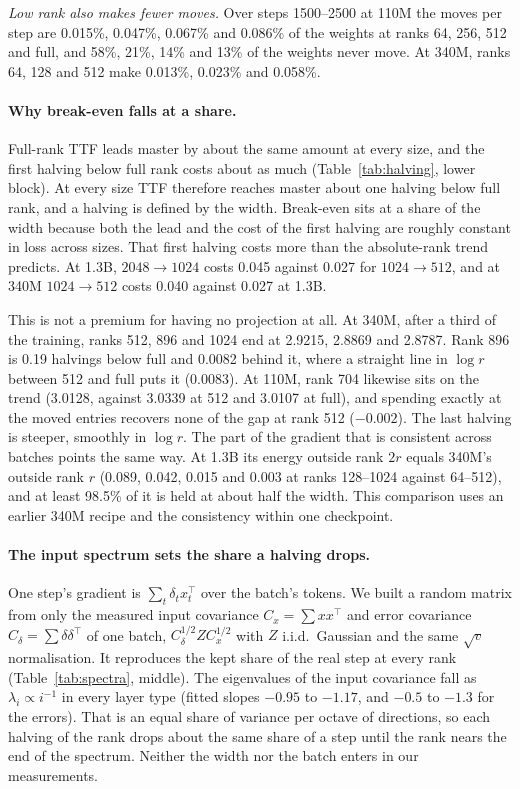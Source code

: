\documentclass[10pt,twocolumn]{article}
\begin{document}
\emph{Low rank also makes fewer moves.} Over steps 1500--2500 at 110M the moves per step are 0.015\%, 0.047\%, 0.067\%
and 0.086\% of the weights at ranks 64, 256, 512 and full, and 58\%, 21\%, 14\% and 13\% of the weights never move. At
340M, ranks 64, 128 and 512 make 0.013\%, 0.023\% and 0.058\%.

\paragraph{Why break-even falls at a share.} Full-rank TTF leads master by about the same amount at every size, and the
first halving below full rank costs about as much (Table~\ref{tab:halving}, lower block). At every size TTF therefore
reaches master about one halving below full rank, and a halving is defined by the width. Break-even sits at a share of
the width because both the lead and the cost of the first halving are roughly constant in loss across sizes. That first
halving costs more than the absolute-rank trend predicts. At 1.3B, $2048\to1024$ costs 0.045 against 0.027 for
$1024\to512$, and at 340M $1024\to512$ costs 0.040 against 0.027 at 1.3B.

This is not a premium for having no projection at all. At 340M, after a third of the training, ranks 512, 896 and 1024
end at 2.9215, 2.8869 and 2.8787. Rank 896 is 0.19 halvings below full and 0.0082 behind it, where a straight line in
$\log r$ between 512 and full puts it (0.0083). At 110M, rank 704 likewise sits on the trend (3.0128, against 3.0339 at
512 and 3.0107 at full), and spending exactly at the moved entries recovers none of the gap at rank 512 ($-0.002$). The
last halving is steeper, smoothly in $\log r$. The part of the gradient that is consistent across batches points
the same way. At 1.3B its energy outside rank $2r$ equals 340M's outside rank $r$ (0.089, 0.042, 0.015 and 0.003 at
ranks 128--1024 against 64--512), and at least 98.5\% of it is held at about half the width. This comparison uses an
earlier 340M recipe and the consistency within one checkpoint.

\paragraph{The input spectrum sets the share a halving drops.} One step's gradient is $\sum_t\delta_tx_t^\top$ over the
batch's tokens. We built a random matrix from only the measured input covariance $C_x=\sum x x^\top$ and error
covariance $C_\delta=\sum\delta\delta^\top$ of one batch, $C_\delta^{1/2}ZC_x^{1/2}$ with $Z$ i.i.d.\ Gaussian and the
same $\sqrt v$ normalisation. It reproduces the kept share of the real step at every rank (Table~\ref{tab:spectra},
middle). The eigenvalues of the input covariance fall as $\lambda_i\propto i^{-1}$ in every layer type (fitted slopes
$-0.95$ to $-1.17$, and $-0.5$ to $-1.3$ for the errors). That is an equal share of variance per octave of directions,
so each halving of the rank drops about the same share of a step until the rank nears the end of the spectrum. Neither
the width nor the batch enters in our measurements.
\end{document}
